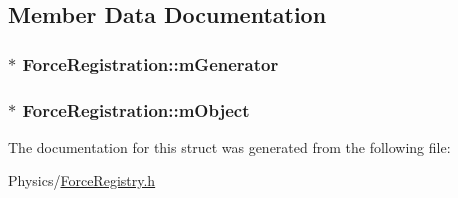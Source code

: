 \subsection{Member Data Documentation}
\subsubsection[{\texorpdfstring{m\+Generator}{mGenerator}}]{$\ast$ Force\+Registration\+::m\+Generator}\hypertarget{structForceRegistration_affe09c5b666826301dfb9d64f8158b39}{}\label{structForceRegistration_affe09c5b666826301dfb9d64f8158b39}
\subsubsection[{\texorpdfstring{m\+Object}{mObject}}]{$\ast$ Force\+Registration\+::m\+Object}\hypertarget{structForceRegistration_a6978eaf6e9b9c99f6b70e59c0c5d1eb1}{}\label{structForceRegistration_a6978eaf6e9b9c99f6b70e59c0c5d1eb1}


The documentation for this struct was generated from the following file\+:\begin{DoxyCompactItemize}
\item 
Physics/\hyperlink{ForceRegistry_8h}{Force\+Registry.\+h}\end{DoxyCompactItemize}
